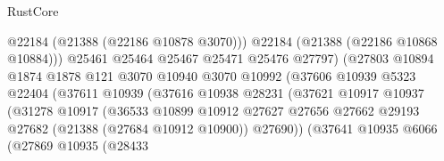 \begin{lexlean}{RustCore}
\begin{coremodule}
                                            @22184
                                            (@21388 (@22186 @10878 @3070)))
                                          @22184
                                          (@21388 (@22186 @10868 @10884)))
                                        @25461
                                        @25464
                                        @25467
                                        @25471
                                        @25476
                                        @27797)
                                      (@27803
                                        @10894
                                        @1874
                                        @1878
                                        @121
                                        @3070
                                        @10940
                                        @3070
                                        @10992
                                        (@37606
                                          @10939
                                          @5323
                                          @22404
                                          (@37611
                                            @10939
                                            (@37616
                                              @10938
                                              @28231
                                              (@37621
                                                @10917
                                                @10937
                                                (@31278
                                                  @10917
                                                  (@36533
                                                    @10899
                                                    @10912
                                                    @27627
                                                    @27656
                                                    @27662
                                                    @29193
                                                    @27682
                                                    (@21388 (@27684 @10912 @10900))
                                                    @27690))
                                                (@37641
                                                  @10935
                                                  @6066
                                                  (@27869
                                                    @10935
                                                    (@28433

\end{coremodule}
\end{lexlean}
